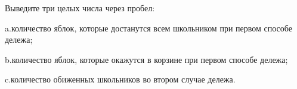 Выведите три целых числа через пробел:

a.количество яблок, которые достанутся всем школьником при первом способе дележа;

b.количество яблок, которые окажутся в корзине при первом способе дележа;

c.количество обиженных школьников во втором случае дележа.